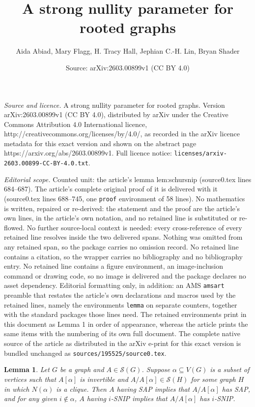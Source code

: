 \documentclass[10pt,a4paper]{amsart}
\title{A strong nullity parameter for rooted graphs}
\author{Aida Abiad, Mary Flagg, H. Tracy Hall, Jephian C.-H. Lin, Bryan Shader}
\date{Source: arXiv:2603.00899v1 (CC BY 4.0)}
\newtheorem{lemma}{Lemma}
\newcommand{\mptn}{\mathcal{S}} %
\begin{document}
\maketitle

\noindent\emph{Source and licence.} A strong nullity parameter for rooted graphs. Version arXiv:2603.00899v1 (CC BY 4.0), distributed by arXiv under the Creative Commons Attribution 4.0 International licence, http://creativecommons.org/licenses/by/4.0/, as recorded in the arXiv licence metadata for this exact version and shown on the abstract page https://arxiv.org/abs/2603.00899v1. Full licence notice: \texttt{licenses/arxiv-2603.00899-CC-BY-4.0.txt}.\par\smallskip

\noindent\textit{Editorial scope.} Counted unit: the article's lemma lem:schursnip (source0.tex lines 684--687). The article's complete original proof of it is delivered with it (source0.tex lines 688--745, one \texttt{proof} environment of 58 lines). No mathematics is written, repaired or re-derived: the statement and the proof are the article's own lines, in the article's own notation, and no retained line is substituted or re-flowed.  No further source-local context is needed: every cross-reference of every retained line resolves inside the two delivered spans.  Nothing was omitted from any retained span, so the package carries no omission record.  No retained line contains a citation, so the wrapper carries no bibliography and no bibliography entry.  No retained line contains a figure environment, an image-inclusion command or drawing code, so no image is delivered and the package declares no asset dependency.  Editorial formatting only, in addition: an AMS \texttt{amsart} preamble that restates the article's own declarations and macros used by the retained lines, namely the environments \texttt{lemma} on separate counters, together with the standard packages those lines need.  The retained environments print in this document as Lemma 1 in order of appearance, whereas the article prints the same items with the numbering of its own full document.  The complete native source of the article as distributed in the arXiv e-print for this exact version is bundled unchanged as \texttt{sources/195525/source0.tex}.
\begin{lemma}
\label{lem:schursnip}
Let $G$ be a graph and $A\in\mptn(G)$.  Suppose $\alpha\subseteq V(G)$ is a subset of vertices such that $A[\alpha]$ is invertible and $A/A[\alpha]\in\mptn(H)$ for some graph $H$ in which $N(\alpha)$ is a clique.  Then $A$ having SAP implies that $A/A[\alpha]$ has SAP, and for any given $i\notin\alpha$, $A$ having $i$-SNIP implies that $A/A[\alpha]$ has $i$-SNIP.  
\end{lemma}
\end{document}
